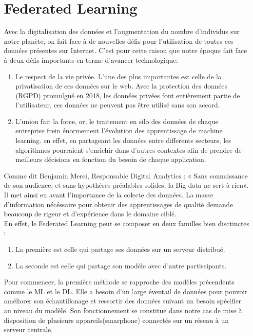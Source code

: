 \documentclass[12pt,a4paper]{report}
\begin{document}
\section{Federated Learning}

Avec la digitalisation des données et l'augmentation du nombre d'individus sur notre planète, on fait face à de nouvelles défis pour l'utilisation de toutes ces données présentes sur Internet. C'est pour cette raison que notre époque fait face à deux défis importants en terme d'avancer technologique: \\
\begin{enumerate}
\item Le respect de la vie privée. L'une des plus importantes est celle de la privatisation de ces données sur le web. Avec la protection des données (RGPD) promulgué en 2018, les données privées font entièrement partie de l'utilisateur, ces données ne peuvent pas être utilisé sans son accord.
\item L'union fait la force, or, le traitement en silo des données de chaque entreprise frein énormement l'évolution des apprentissage de machine learning. en effet, en partageant les données entre differents secteurs, les algorithmes pourraient s'enrichir dans d'autres contextes afin de prendre de meilleurs décisions en fonction du besoin de chaque application.
\end{enumerate}
Comme dit Benjamin Merci, Responsable Digital Analytics : « Sans connaissance de son audience, et sans hypothèses préalables solides, la Big data ne sert à rien». Il met ainsi en avant l'importance de la colecte des données. La masse d'information nécéssaire pour obtenir des apprentissages de qualité demande beaucoup de rigeur et d'expérience dans le domaine ciblé.\\

En effet, le Federated Learning peut se composer en deux familles bien disctinctes :
\begin{enumerate}
\item La première est celle qui partage ses données sur un serveur distribué.
\item La seconde est celle qui partage son modèle avec d'autre partissipants.
\end{enumerate}

Pour commencer, la première méthode se rapproche des modèles précendents comme le ML et le DL. Elle a besoin d'un large éventail de données pour pouvoir améliorer son échantillonage et ressortir des données suivant un besoin spécifier au niveau du modèle. Son fonctionnement se constitue dans notre cas de mise à disposition de plusieurs appareils(smarphone) connectés sur un réseau à un serveur centrale.
\end{document}
